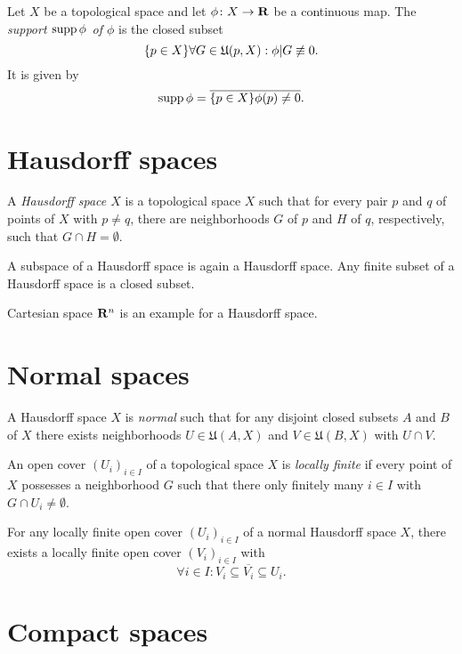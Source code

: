 Let $X$ be a topological space and let $\phi\colon X \to \mathbf{R}$ be a continuous map.
The \emph{support $\operatorname{supp} \phi$ of $\phi$} is the closed subset
\[
  \lbrace p \in X\rbrace{\forall G \in \mathfrak U(p, X): \phi|G \not\equiv 0}.
\]
It is given by
\begin{equation}
  \label{eq:support}
  \operatorname{supp} \phi = \overline{\lbrace p \in X\rbrace{\phi(p) \neq 0}}.
\end{equation}

\section{Hausdorff spaces}
\label{sec:hausdorff_spaces}

\begin{dfn}
  A \emph{Hausdorff space $X$} is a topological space $X$ such that for every
  pair $p$ and $q$ of points of $X$ with $p \neq q$, there are neighborhoods $G$
  of $p$ and $H$ of $q$, respectively, such that $G \cap H = \emptyset$.
\end{dfn}
A subspace of a Hausdorff space is again a Hausdorff space. Any finite subset of
a Hausdorff space is a closed subset.

Cartesian space $\mathbf{R}^n$ is an example for a Hausdorff space.

\section{Normal spaces}

\begin{dfn}
  A Hausdorff space $X$ is \emph{normal} such that for any disjoint closed
  subsets $A$ and $B$ of $X$ there exists neighborhoods $U \in \mathfrak U(A, X)$
  and $V \in \mathfrak U(B, X)$ with $U \cap V$.
\end{dfn}

An open cover $(U_i)_{i \in I}$ of a topological space $X$ is \emph{locally finite}
if every point of $X$ possesses a neighborhood $G$ such that there only finitely
many $i \in I$ with $G \cap U_i \neq \emptyset$.
\begin{thm}
  \label{prop:shrinking_lemma}
  For any locally finite open cover $(U_i)_{i \in I}$ of a normal Hausdorff space $X$, there
  exists a locally finite open cover $(V_i)_{i \in I}$ with
  \[
    \forall i \in I : V_i \subseteq \overline{V_i} \subseteq U_i.
  \]
\end{thm}

\section{Compact spaces}
\label{sec:compact}

